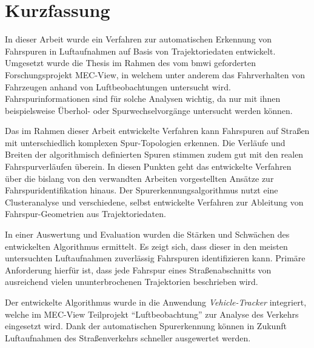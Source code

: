 
\chapter{Kurzfassung}

In dieser Arbeit wurde ein Verfahren zur automatischen Erkennung von Fahrspuren in Luftaufnahmen
auf Basis von Trajektoriedaten entwickelt. Umgesetzt wurde die Thesis im Rahmen des vom \acrshort*{bmwi}
geforderten Forschungsprojekt MEC-View, in welchem unter anderem das Fahrverhalten von Fahrzeugen
anhand von Luftbeobachtungen untersucht wird. Fahrspurinformationen sind für solche Analysen
wichtig, da nur mit ihnen beispielsweise Überhol- oder Spurwechselvorgänge untersucht werden können.

Das im Rahmen dieser Arbeit entwickelte Verfahren kann Fahrspuren auf Straßen mit unterschiedlich komplexen Spur-Topologien erkennen. 
Die Verläufe und Breiten der algorithmisch definierten Spuren stimmen zudem gut mit den realen
Fahrspurverläufen überein. In diesen Punkten geht das entwickelte Verfahren über die bislang von den
verwandten Arbeiten vorgestellten Ansätze zur Fahrspuridentifikation hinaus.
Der Spurerkennungsalgorithmus nutzt eine Clusteranalyse und verschiedene, selbst entwickelte Verfahren zur
Ableitung von Fahrspur-Geometrien aus Trajektoriedaten.

In einer Auswertung und Evaluation wurden die Stärken und Schwächen des entwickelten Algorithmus ermittelt.
Es zeigt sich, dass dieser in den meisten untersuchten Luftaufnahmen zuverlässig Fahrspuren identifizieren kann.
Primäre Anforderung hierfür ist, dass jede Fahrspur eines Straßenabschnitts von ausreichend vielen ununterbrochenen
Trajektorien beschrieben wird.

Der entwickelte Algorithmus wurde in die Anwendung \textit{Vehicle-Tracker} integriert,
welche im MEC-View Teilprojekt ``Luftbeobachtung'' zur Analyse des Verkehrs eingesetzt wird.
Dank der automatischen Spurerkennung können in Zukunft Luftaufnahmen des Straßenverkehrs schneller
ausgewertet werden.


